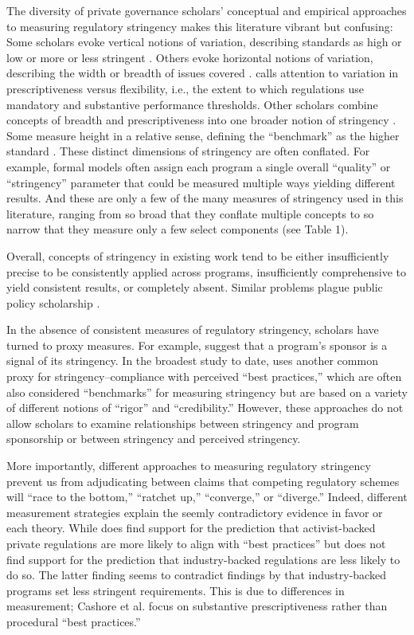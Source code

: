 \documentclass[
      12pt,
            Review ]{article}
\begin{document}
The diversity of private governance scholars' conceptual and empirical
approaches to measuring regulatory stringency makes this literature
vibrant but confusing: Some scholars evoke vertical notions of
variation, describing standards as high or low or more or less stringent
\citep{Fischer2014, Li2015}. Others evoke horizontal notions of
variation, describing the width or breadth of issues covered
\citep{Auld2014, Heyes2017}. \citet{Cashore2007} calls attention to
variation in prescriptiveness versus flexibility, i.e., the extent to
which regulations use mandatory and substantive performance thresholds.
Other scholars combine concepts of breadth and prescriptiveness into one
broader notion of stringency \citep{Fransen2011}. Some measure height in
a relative sense, defining the ``benchmark'' as the higher standard
\citep{Overdevest2005, Overdevest2010}. These distinct dimensions of
stringency are often conflated. For example, formal models often assign
each program a single overall ``quality'' or ``stringency'' parameter
that could be measured multiple ways yielding different results. And
these are only a few of the many measures of stringency used in this
literature, ranging from so broad that they conflate multiple concepts
to so narrow that they measure only a few select components (see Table
1).

Overall, concepts of stringency in existing work tend to be either
insufficiently precise to be consistently applied across programs,
insufficiently comprehensive to yield consistent results, or completely
absent. Similar problems plague public policy scholarship
\citep{Brunel2016}.



In the absence of consistent measures of regulatory stringency, scholars
have turned to proxy measures. For example, \citet{Darnall2010} suggest
that a program's sponsor is a signal of its stringency. In the broadest
study to date, \citet{VanderVen2015} uses another common proxy for
stringency--compliance with perceived ``best practices,'' which are
often also considered ``benchmarks'' for measuring stringency but are
based on a variety of different notions of ``rigor'' and
``credibility.'' However, these approaches do not allow scholars to
examine relationships between stringency and program sponsorship or
between stringency and perceived stringency.

More importantly, different approaches to measuring regulatory
stringency prevent us from adjudicating between claims that competing
regulatory schemes will ``race to the bottom,'' ``ratchet up,''
``converge,'' or ``diverge.'' Indeed, different measurement strategies
explain the seemly contradictory evidence in favor or each theory. While
\citet{VanderVen2015} does find support for the prediction that
activist-backed private regulations are more likely to align with ``best
practices'' but does not find support for the prediction that
industry-backed regulations are less likely to do so. The latter finding
seems to contradict findings by \citet{Cashore2004} that industry-backed
programs set less stringent requirements. This is due to differences in
measurement; Cashore et al. focus on substantive prescriptiveness rather
than procedural ``best practices.''
\end{document}
